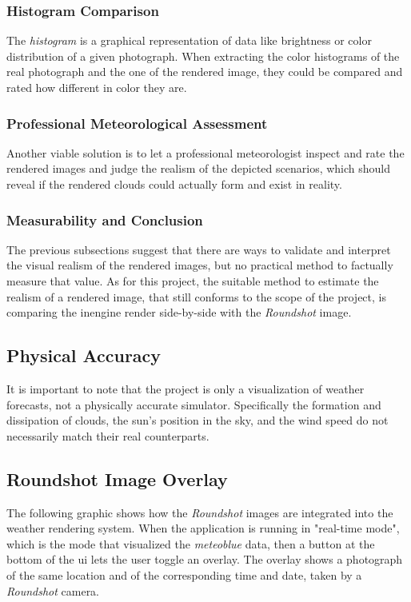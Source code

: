 \subsubsection{Histogram Comparison}
The \textit{\gls{histogram}} is a graphical representation of data like brightness or color distribution of a given photograph.
When extracting the color \gls{histogram}s of the real photograph and the one of the rendered image, they could be compared and rated how different in color they are.

\subsubsection{Professional Meteorological Assessment}
Another viable solution is to let a professional meteorologist inspect and rate the rendered images and judge the realism of the depicted scenarios, which should reveal if the rendered clouds could actually form and exist in reality.

\subsubsection{Measurability and Conclusion}
The previous subsections suggest that there are ways to validate and interpret the visual realism of the rendered images, but no practical method to factually measure that value.
As for this project, the suitable method to estimate the realism of a rendered image, that still conforms to the scope of the project, is comparing the \gls{inengine} render side-by-side with the \emph{Roundshot} image.

\subsection{Physical Accuracy}
It is important to note that the project is only a visualization of weather forecasts, not a physically accurate simulator.
Specifically the formation and dissipation of clouds, the sun's position in the sky, and the wind speed do not necessarily match their real counterparts.

\clearpage

\subsection{Roundshot Image Overlay}
The following graphic shows how the \emph{Roundshot} images are integrated into the weather rendering system.
When the application is running in "real-time mode", which is the mode that visualized the \emph{meteoblue} data, then a button at the bottom of the \gls{ui} lets the user toggle an overlay.
The overlay shows a photograph of the same location and of the corresponding time and date, taken by a \emph{Roundshot} camera.

